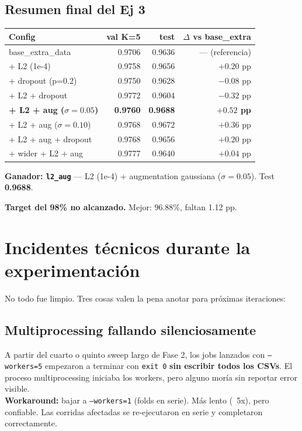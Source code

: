 \documentclass[11pt,a4paper]{article}
\newcommand{\code}[1]{\texttt{\textcolor{accent}{#1}}}
\newcommand{\winner}[1]{\cellcolor{accent2!15}\textbf{#1}}
\begin{document}
\subsection{Resumen final del Ej 3}

\begin{center}
\small
\begin{tabular}{@{}lrrr@{}}
\toprule
\textbf{Config} & \textbf{val K=5} & \textbf{test} & \textbf{$\Delta$ vs base\_extra} \\
\midrule
base\_extra\_data            & 0.9706 & 0.9636 & --- (referencia) \\
+ L2 (1e-4)                  & 0.9758 & 0.9656 & $+0.20$ pp \\
+ dropout (p=0.2)            & 0.9750 & 0.9628 & $-0.08$ pp \\
+ L2 + dropout               & 0.9772 & 0.9604 & $-0.32$ pp \\
\winner{+ L2 + aug ($\sigma=0.05$)} & \winner{0.9760} & \winner{\textbf{0.9688}} & \winner{$+0.52$ pp} \\
+ L2 + aug ($\sigma=0.10$)   & 0.9768 & 0.9672 & $+0.36$ pp \\
+ L2 + aug + dropout         & 0.9768 & 0.9656 & $+0.20$ pp \\
+ wider + L2 + aug           & 0.9777 & 0.9640 & $+0.04$ pp \\
\bottomrule
\end{tabular}
\end{center}

\textbf{Ganador: \texttt{l2\_aug}} — L2 (1e-4) + augmentation gaussiana ($\sigma=0.05$). Test \textbf{0.9688}.

\textbf{Target del 98\% no alcanzado.} Mejor: 96.88\%, faltan 1.12 pp.

\section{Incidentes técnicos durante la experimentación}

No todo fue limpio. Tres cosas valen la pena anotar para próximas iteraciones:

\subsection{Multiprocessing fallando silenciosamente}

A partir del cuarto o quinto sweep largo de Fase 2, los jobs lanzados con \code{--workers=5} empezaron a terminar con \texttt{exit 0} \textbf{sin escribir todos los CSVs}. El proceso multiprocessing iniciaba los workers, pero alguno moría sin reportar error visible. \\[0.4em]
\textbf{Workaround:} bajar a \code{--workers=1} (folds en serie). Más lento (~5x), pero confiable. Las corridas afectadas se re-ejecutaron en serie y completaron correctamente.
\end{document}
